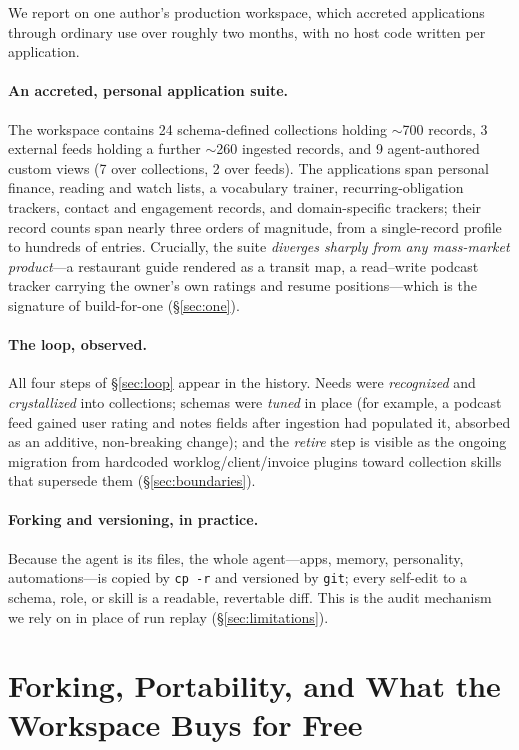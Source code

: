 \documentclass[11pt]{article}
\newcommand{\code}[1]{\texttt{\small #1}}
\begin{document}
We report on one author's production workspace, which accreted applications through
ordinary use over roughly two months, with no host code written per application.

\paragraph{An accreted, personal application suite.}
The workspace contains 24 schema-defined collections holding $\sim$700 records,
3 external feeds holding a further $\sim$260 ingested records, and 9 agent-authored
custom views (7 over collections, 2 over feeds). The applications span personal
finance, reading and watch lists, a vocabulary trainer, recurring-obligation
trackers, contact and engagement records, and domain-specific trackers; their record
counts span nearly three orders of magnitude, from a single-record profile to
hundreds of entries. Crucially, the suite \emph{diverges sharply from any
mass-market product}---a restaurant guide rendered as a transit map, a read--write
podcast tracker carrying the owner's own ratings and resume positions---which is the
signature of build-for-one (\S\ref{sec:one}).

\paragraph{The loop, observed.}
All four steps of \S\ref{sec:loop} appear in the history. Needs were
\emph{recognized} and \emph{crystallized} into collections; schemas were
\emph{tuned} in place (for example, a podcast feed gained user rating and notes
fields after ingestion had populated it, absorbed as an additive, non-breaking
change); and the \emph{retire} step is visible as the ongoing migration from
hardcoded worklog/client/invoice plugins toward collection skills that supersede
them (\S\ref{sec:boundaries}).

\paragraph{Forking and versioning, in practice.}
Because the agent is its files, the whole agent---apps, memory, personality,
automations---is copied by \code{cp -r} and versioned by \code{git}; every
self-edit to a schema, role, or skill is a readable, revertable diff. This is the
audit mechanism we rely on in place of run replay (\S\ref{sec:limitations}).

\section{Forking, Portability, and What the Workspace Buys for Free}
\label{sec:forking}
\end{document}
